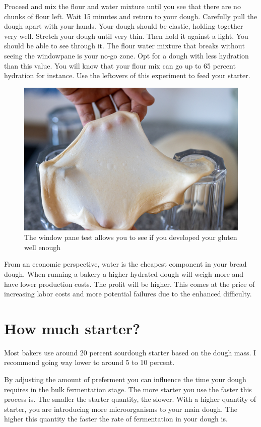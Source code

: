 Proceed and mix the flour and water mixture until you see that there
are no chunks of flour left. Wait 15 minutes and return to your dough.
Carefully pull the dough apart with your hands. Your dough should be elastic, holding 
together very well. Stretch your dough until very thin. Then hold it against a light.
You should be able to see through it. The flour water mixture that breaks without
seeing the windowpane is your no-go zone. Opt for a dough with
less hydration than this value. You will know that your flour mix can go up to
65 percent hydration for instance. Use the leftovers of this experiment
to feed your starter.


\begin{figure}[!htb]
  \includegraphics[width=\textwidth]{window-pane-effect}
  \caption
    {The window pane test allows you to see if you developed your gluten well enough}
\end{figure}


From an economic perspective, water is the cheapest component in your bread
dough. When running a bakery a higher hydrated dough will weigh more and have
lower production costs. The profit will be higher. This comes at the price
of increasing labor costs and more potential failures due to the enhanced
difficulty.

\section{How much starter?}

Most bakers use around 20 percent sourdough starter based on the dough mass. I
recommend going way lower to around 5 to 10 percent.

By adjusting the amount of preferment you can influence the time your dough
requires in the bulk fermentation stage. The more starter you use the faster
this process is. The smaller the starter quantity, the slower. With a higher
quantity of starter, you are introducing more microorganisms to your main
dough. The higher this quantity the faster the rate of fermentation in your
dough is.

